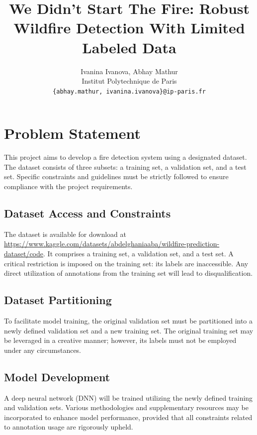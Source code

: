 \documentclass{article}
\title{We Didn't Start The Fire: Robust Wildfire Detection With Limited Labeled Data}
\author{
  Ivanina Ivanova, Abhay Mathur \\
  Institut Polytechnique de Paris \\
  \texttt{\{abhay.mathur, ivanina.ivanova\}@ip-paris.fr} \\
}
\begin{document}
\maketitle


\section{Problem Statement}
This project aims to develop a fire detection system using a designated
dataset. The dataset consists of three subsets: a training set, a validation
set, and a test set. Specific constraints and guidelines must be strictly
followed to ensure compliance with the project requirements.

\subsection{Dataset Access and Constraints}

The dataset is available for download at
\url{https://www.kaggle.com/datasets/abdelghaniaaba/wildfire-prediction-dataset/code}.
It comprises a training set, a validation set, and a test set. A critical
restriction is imposed on the training set: its labels are inaccessible. Any
direct utilization of annotations from the training set will lead to
disqualification.

\subsection{Dataset Partitioning}

To facilitate model training, the original validation set must be partitioned
into a newly defined validation set and a new training set. The original
training set may be leveraged in a creative manner; however, its labels must
not be employed under any circumstances.

\subsection{Model Development}

A deep neural network (DNN) will be trained utilizing the newly defined
training and validation sets. Various methodologies and supplementary resources
may be incorporated to enhance model performance, provided that all constraints
related to annotation usage are rigorously upheld.
\end{document}
